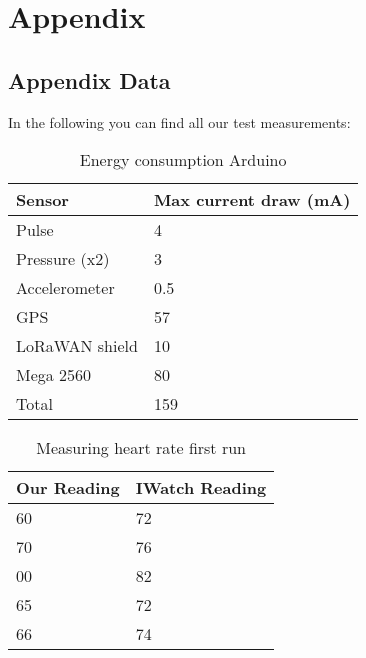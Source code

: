 \chapter{Appendix}


\section{Appendix Data}
In the following you can find all our test measurements:
\begin{table}[h]
	\begin{tabular}{@{}ll@{}}
		\toprule
		\textbf{Sensor}& \textbf{Max current draw (mA)} \\ \midrule
		Pulse          & 4                     \\
		Pressure (x2)  & 3                     \\
		Accelerometer  & 0.5                   \\
		GPS            & 57                    \\
		LoRaWAN shield & 10                    \\
		Mega 2560      & 80                    \\
		Total          & 159                   \\ \bottomrule
	\end{tabular}
	\caption[Energy consumption Arduino]{Energy consumption Arduino}
	\label{tab:EnergyConsumption}
\end{table}

\begin{table}[h]
	\begin{tabular}{@{}ll@{}}
		\toprule
		\textbf{Our Reading} & \textbf{IWatch Reading }\\ \midrule
		60          & 72             \\
		70          & 76             \\
		00          & 82             \\
		65          & 72             \\
		66          & 74             \\ \bottomrule
	\end{tabular}
	\caption[Measuring heart rate first run]{Measuring heart rate first run}
	\label{tab:HeartRateFirst}
\end{table}

